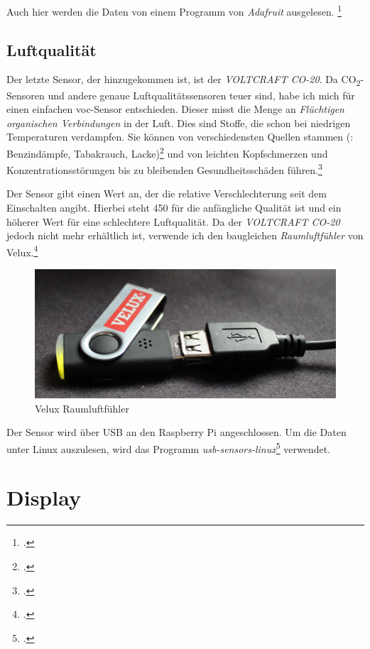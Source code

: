 Auch hier werden die Daten von einem Programm von \emph{Adafruit} ausgelesen. \footcite[Using the Adafruit BMP Python Library (Updated)]{bmp058_adafruit}

\subsection{Luftqualität}
\label{subsec:Luftqualitat}
Der letzte Sensor, der hinzugekommen ist, ist der \emph{VOLTCRAFT CO-20}. Da CO\textsubscript{2}-Sensoren und andere genaue Luftqualitätssensoren teuer sind, habe ich mich für einen einfachen \acrshort{voc}-Sensor entschieden. Dieser misst die Menge an \emph{Flüchtigen organischen Verbindungen} in der Luft. Dies sind Stoffe, die schon bei niedrigen Temperaturen verdampfen. Sie können von verschiedensten Quellen stammen (\zB: Benzindämpfe, Tabakrauch, Lacke)\footcite[41\psqq]{innenraum} und von leichten Kopfschmerzen und Konzentrationsstörungen bis zu bleibenden Gesundheitsschäden führen.\footcite[Gesundheitliche Wirkung]{VOC}

Der Sensor gibt einen Wert an, der die relative Verschlechterung seit dem Einschalten angibt. Hierbei steht 450 für die anfängliche Qualität ist und ein höherer Wert für eine schlechtere Luftqualität.
Da der \emph{VOLTCRAFT CO-20} jedoch nicht mehr erhältlich ist, verwende ich den baugleichen \emph{Raumluftfühler} von Velux.\footcite{Velux}

\begin{figure}[h]
  \centering
     \includegraphics[width=\textwidth]{figures/velux.jpg}
  \caption{Velux Raumluftfühler}
  \label{fig:velux}
\end{figure}

Der Sensor wird über USB an den Raspberry Pi angeschlossen. Um die Daten unter Linux auszulesen, wird das Programm \emph{usb-sensors-linux}\footcite{usb-sensors-linux} verwendet.

\section{Display}
\label{sec:Display}

